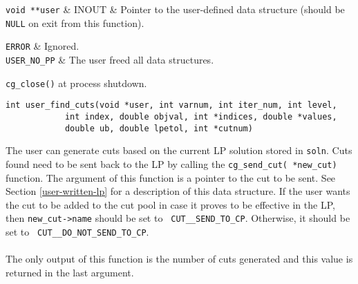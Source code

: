 \args

{\tt void **user} & INOUT & Pointer to the user-defined data structure
(should be {\tt NULL} on exit from this function). \\
\et

\returns

{\tt ERROR} & Ignored. \\
{\tt USER\_NO\_PP} & The user freed all data structures. \\
\et

\item[Invoked from:] {\tt cg\_close()} at process shutdown. 

\ed

\vspace{1ex}


\begin{verbatim}
int user_find_cuts(void *user, int varnum, int iter_num, int level,
		    int index, double objval, int *indices, double *values,
		    double ub, double lpetol, int *cutnum)
\end{verbatim}

\bd

\describe

The user can generate cuts based on the current LP solution stored in
{\tt soln}. Cuts found need to be sent back to the LP by calling the
{\tt cg\_send\_cut( *new\_cut)} function.
The argument of this function is a pointer to the cut to be sent. See
Section
\ref{user-written-lp} for a description of this data structure. If the
user wants the cut to be added to the cut pool in case it proves to be
effective in the LP, then {\tt new\_cut->name} should be set to {\tt
CUT\_\_SEND\_TO\_CP}. Otherwise, it should be set to {\tt
CUT\_\_DO\_NOT\_SEND\_TO\_CP}.\\
\\
The only output of this function is the number of cuts generated and this
value is returned in the last argument.

\args

